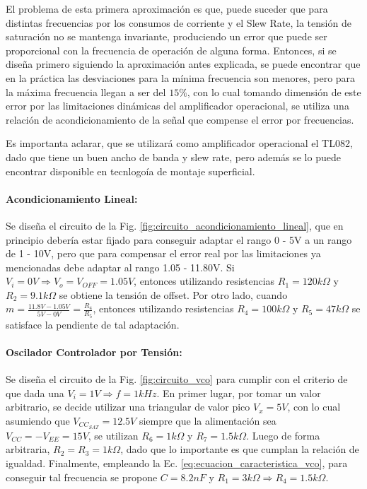 El problema de esta primera aproximaci\'on es que, 
puede suceder que para distintas frecuencias por los consumos de corriente y el Slew Rate, la tensi\'on de saturaci\'on no se mantenga invariante, produciendo un error 
que puede ser proporcional con la frecuencia de operaci\'on de alguna forma. Entonces, si se dise\~na primero siguiendo la aproximaci\'on antes explicada, se puede encontrar que en la pr\'actica
las desviaciones para la m\'inima frecuencia son menores, pero para la m\'axima frecuencia llegan a ser del $15 \%$, con lo cual tomando dimensi\'on de este error por las limitaciones din\'amicas del amplificador 
operacional, se utiliza una relaci\'on de acondicionamiento de la se\~nal que compense el error por frecuencias.


Es importanta aclarar, que se utilizar\'a como amplificador operacional el TL082, dado que tiene un buen ancho de banda y slew rate, pero adem\'as se lo puede encontrar disponible en tecnlogo\'ia de montaje superficial.

\paragraph{Acondicionamiento Lineal:} Se dise\~na el circuito de la Fig. \ref{fig:circuito_acondicionamiento_lineal}, que en principio deber\'ia estar fijado para conseguir adaptar el rango 0 - 5V a
un rango de 1 - 10V, pero que para compensar el error real por las limitaciones ya mencionadas debe adaptar al rango 1.05 - 11.80V. Si $V_i = 0V \Rightarrow V_o = V_{OFF} = 1.05V$, entonces utilizando resistencias $R_1 = 120k \Omega$ y $R_2 = 9.1k \Omega$ se 
obtiene la tensi\'on de offset. Por otro lado, cuando $m = \frac{11.8V - 1.05V}{5V - 0V} = \frac{R_4}{R_5}$, entonces utilizando resistencias $R_4 = 100k \Omega$ y $R_5 = 47k \Omega$ se satisface la pendiente de tal adaptaci\'on.

\paragraph{Oscilador Controlador por Tensi\'on:} Se dise\~na el circuito de la Fig. \ref{fig:circuito_vco} para cumplir con el criterio de que dada una $V_i = 1V \Rightarrow f = 1kHz$. En primer lugar, por tomar un valor arbitrario,
se decide utilizar una triangular de valor pico $V_x = 5V$, con lo cual asumiendo que $V_{CC_{SAT}} = 12.5V$ siempre que la alimentaci\'on sea $V_{CC} = -V_{EE} = 15V$, se utilizan $R_6 = 1k \Omega $ y $R_7 = 1.5k \Omega $. Luego de forma arbitraria, $R_2 = R_3 = 1k \Omega$, dado que lo importante
es que cumplan la relaci\'on de igualdad. Finalmente, empleando la Ec. \ref{eq:ecuacion_caracteristica_vco}, para conseguir tal frecuencia se propone $C = 8.2 nF$ y $R_1 = 3k \Omega \Rightarrow R_4 = 1.5k \Omega$.

